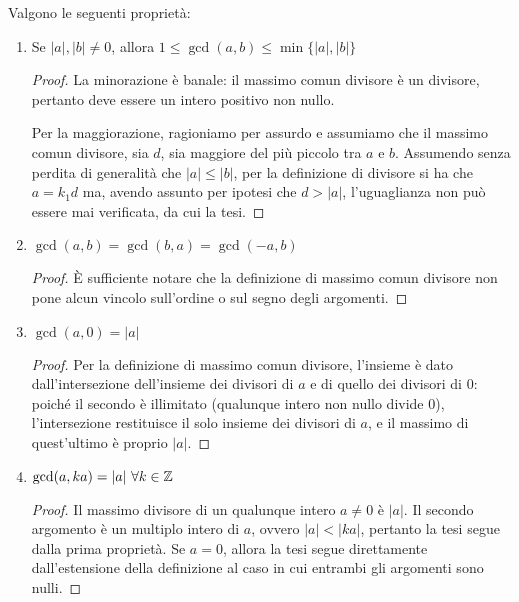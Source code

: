 \begin{proposizione}
Valgono le seguenti proprietà:
\begin{enumerate}
\item Se $|a|,|b|\neq 0$, allora $1\leq \gcd(a,b) \leq \min\{|a|,|b|\}$
\begin{proof}
La minorazione è banale: il massimo comun divisore è un divisore, pertanto deve essere un intero positivo non nullo. 

Per la maggiorazione, ragioniamo per assurdo e assumiamo che il massimo comun divisore, sia $d$, sia maggiore del più piccolo tra $a$ e $b$. Assumendo senza perdita di generalità che $|a| \leq |b|$, per la definizione di divisore si ha che $a = k_1d$ ma, avendo assunto per ipotesi che $d > |a|$, l'uguaglianza non può essere mai verificata, da cui la tesi.
\end{proof}

\item $\gcd(a,b)=\gcd(b,a)=\gcd(-a,b)$
\begin{proof}
È sufficiente notare che la definizione di massimo comun divisore non pone alcun vincolo sull'ordine o sul segno degli argomenti.
\end{proof}

\item $\gcd(a,0) = |a|$
\begin{proof}
Per la definizione di massimo comun divisore, l'insieme è dato dall'intersezione dell'insieme dei divisori di $a$ e di quello dei divisori di $0$: poiché il secondo è illimitato (qualunque intero non nullo divide $0$), l'intersezione restituisce il solo insieme dei divisori di $a$, e il massimo di quest'ultimo è proprio $|a|$.
\end{proof}

\item $\gcd(a, ka)=|a|\ \forall k\in\operatorname*{\mathbb{Z}}$
\begin{proof}
Il massimo divisore di un qualunque intero $a\neq0$ è $|a|$. Il secondo argomento è un multiplo intero di $a$, ovvero $|a| < |ka|$, pertanto la tesi segue dalla prima proprietà. Se $a=0$, allora la tesi segue direttamente dall'estensione della definizione al caso in cui entrambi gli argomenti sono nulli.
\end{proof}
\end{enumerate}
\end{proposizione}

